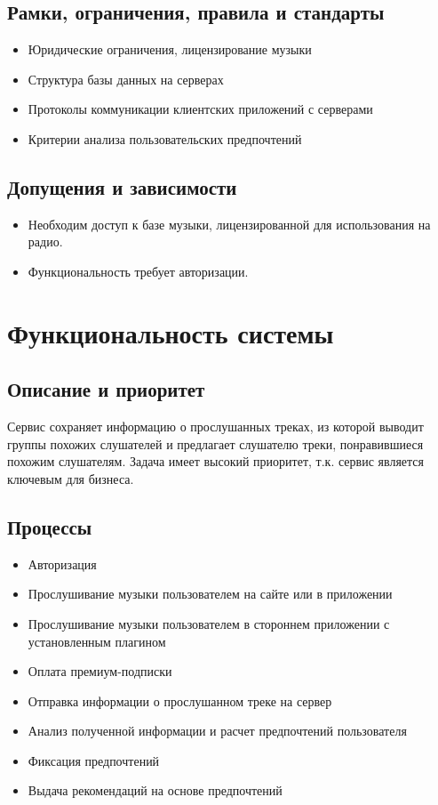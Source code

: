 \subsection{Рамки, ограничения, правила и стандарты}
\begin{itemize}
    \item Юридические ограничения, лицензирование музыки
    \item Структура базы данных на серверах
    \item Протоколы коммуникации клиентских приложений с серверами
    \item Критерии анализа пользовательских предпочтений
\end{itemize}

\subsection{Допущения и зависимости}
\begin{itemize}
    \item Необходим доступ к базе музыки, лицензированной для использования на радио.
    \item Функциональность требует авторизации.
\end{itemize}

\section{Функциональность системы}
\subsection{Описание и приоритет}
Сервис сохраняет информацию о прослушанных треках,
из которой выводит группы похожих слушателей
и предлагает слушателю треки, понравившиеся похожим слушателям.
Задача имеет высокий приоритет, т.к. сервис является ключевым для бизнеса.

\subsection{Процессы}
\begin{itemize}
    \item Авторизация
    \item Прослушивание музыки пользователем на сайте или в приложении
    \item Прослушивание музыки пользователем в стороннем приложении с установленным плагином
    \item Оплата премиум-подписки
    \item Отправка информации о прослушанном треке на сервер
    \item Анализ полученной информации и расчет предпочтений пользователя
    \item Фиксация предпочтений
    \item Выдача рекомендаций на основе предпочтений
\end{itemize}

